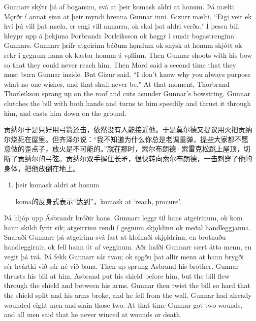 \begin{paracol}{2}
    Gunnarr skýtr þá af boganum, svá at þeir komask aldri at honum. Þá mælti Mǫrðr í annat sinn at þeir myndi brenna Gunnar inni. Gizurr mælti, ``Eigi veit ek hví þú vill þat mæla, er engi vill annarra, ok skal þat aldri verða." Í þessu bili hleypr upp á þekjuna Þorbrandr Þorleiksson ok høggr í sundr bogastrenginn Gunnars. Gunnarr þrífr atgeirinn báðum hǫndum ok snýsk at honum skjótt ok rekr í gegnum hann ok kastar honum á vǫllinn.
    \switchcolumn
    Then Gunnar shoots with his bow so that they could never reach him. Then Mord said a second time that they must burn Gunnar inside. But Gizur said, ``I don't know why you always purpose what no one wishes, and that shall never be." At that moment, Thorbrand Thorleikson sprang up on the roof and cuts asunder Gunnar's bowstring. Gunnar clutches the bill with both hands and turns to him speedily and thrust it through him, and casts him down on the ground.
\end{paracol}
\begin{translation*}{}
    贡纳尔于是只好用弓箭还击，依然没有人能接近他。于是莫尔德又提议用火把贡纳尔烧死在屋里。但齐泽尔说：“我不知道为什么你总是老调重弹，提些大家都不愿意做的歪点子，放火是不可能的。”就在那时，索尔布朗德·索雷克松跳上屋顶，切断了贡纳尔的弓弦。贡纳尔双手握住长矛，很快转向索尔布朗德，一击刺穿了他的身体，把他放倒在地上。
\end{translation*}
\begin{grammar*}{}
    \begin{enumerate}[leftmargin=*]
        \item þeir komask aldri at honum

              koma的反身式表示“达到”，komask at `reach, procure'.
    \end{enumerate}
\end{grammar*}
\begin{paracol}{2}
    Þá hljóp upp Ásbrandr bróðir hans. Gunnarr leggr til hans atgeirinum, ok kom hann skildi fyrir sik; atgeirrinn rendi í gegnum skjǫldinn ok meðal handleggjanna. Snaraði Gunnarr þá atgeirinn svá fast at klofnaði skjǫldrinn, en brotnuðu handleggirnir, ok fell hann út af vegginum. Aðr hafði Gunnarr sært átta menn, en vegit þá tvá. Þá fekk Gunnarr sár tvau; ok sǫgðu þat allir menn at hann brygði sér hvártki við sár né við bana.
    \switchcolumn
    Then up sprung Asbrand his brother. Gunnar thrusts his bill at him. Asbrand put his shield before him, but the bill flew through the shield and between his arms. Gunnar then twist the bill so hard that the shield split and his arms broke, and he fell from the wall. Gunnar had already wounded eight men and slain those two. At that time Gunnar got two wounds, and all men said that he never winced at wounds or death.
\end{paracol}
